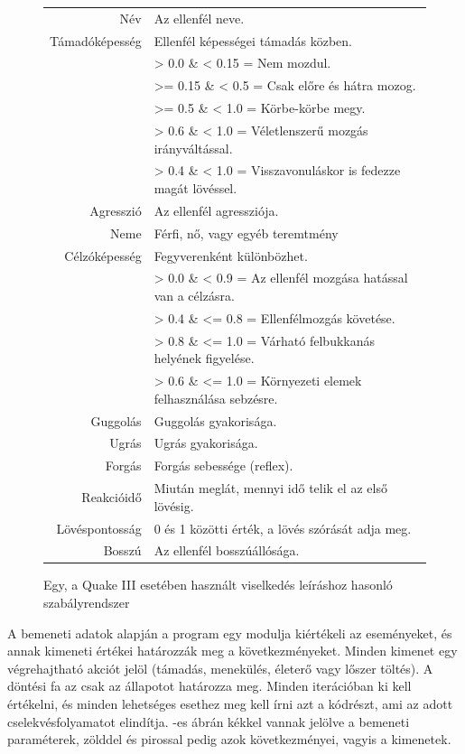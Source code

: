 
\begin{figure}[h!]
\centering
\begin{tabular}{r|l}
Név & Az ellenfél neve. \\
Támadóképesség & Ellenfél képességei támadás közben.\\
&> 0.0 \& < 0.15 = Nem mozdul.\\
&>= 0.15 \& < 0.5 = Csak előre és hátra mozog.\\
&>= 0.5 \& < 1.0 = Körbe-körbe megy.\\
&> 0.6 \& < 1.0 = Véletlenszerű mozgás irányváltással.\\
&> 0.4 \& < 1.0 = Visszavonuláskor is fedezze magát lövéssel.\\
Agresszió & Az ellenfél agressziója.\\
Neme & Férfi, nő, vagy egyéb teremtmény\\
Célzóképesség & Fegyverenként különbözhet.\\
&> 0.0 \& < 0.9 = Az ellenfél mozgása hatással van a célzásra.\\
&> 0.4 \& <= 0.8 = Ellenfélmozgás követése.\\
&> 0.8 \& <= 1.0 = Várható felbukkanás helyének figyelése.\\
&> 0.6 \& <= 1.0 = Környezeti elemek felhasználása sebzésre.\\
Guggolás & Guggolás gyakorisága.\\
Ugrás & Ugrás gyakorisága.\\
Forgás & Forgás sebessége (reflex).\\
Reakcióidő & Miután meglát, mennyi idő telik el az első lövésig.\\
Lövéspontosság & 0 és 1 közötti érték, a lövés szórását adja meg.\\
Bosszú & Az ellenfél bosszúállósága.\\
\end{tabular}
\caption{Egy, a Quake III esetében használt viselkedés leíráshoz hasonló szabályrendszer \cite{quakebot}}
\label{tab:charactersitic}
\end{figure}


A bemeneti adatok alapján a program egy modulja kiértékeli az eseményeket, és annak kimeneti értékei határozzák meg a következményeket. Minden kimenet egy végrehajtható akciót jelöl (támadás, menekülés, életerő vagy lőszer töltés). A döntési fa az csak az állapotot határozza meg. Minden iterációban ki kell értékelni, és minden lehetséges esethez meg kell írni azt a kódrészt, ami az adott cselekvésfolyamatot elindítja. -es ábrán kékkel vannak jelölve a bemeneti paraméterek, zölddel és pirossal pedig azok következményei, vagyis a kimenetek.

